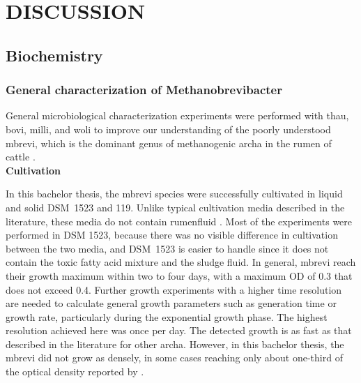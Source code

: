 \newpage
\section{DISCUSSION}



\subsection{Biochemistry}



\subsubsection{General characterization of \textup{Methanobrevibacter}}


General microbiological characterization experiments were performed with \acrshort{thau}, \acrshort{bovi}, \acrshort{milli}, and \acrshort{woli} to improve our understanding of the poorly understood \acrlong{mbrevi}, which is the dominant genus of methanogenic \gls{archa} in the rumen of cattle \parencite{baca-gonzalezAreVaccinesSolution2020}. \\

\textbf{Cultivation} 

\noindent In this bachelor thesis, the \acrlong{mbrevi} species were successfully cultivated in liquid and solid DSM~1523 and 119. Unlike typical cultivation media described in the literature, these media do not contain rumenfluid \parencite{liMethanobrevibacterBoviskoreaniJH1T2023, leeMethanobrevibacterBoviskoreaniSp2013, millerDescriptionMethanobrevibacterGottschalkii2002}. Most of the experiments were performed in DSM 1523, because there was no visible difference in cultivation between the two media, and DSM~1523 is easier to handle since it does not contain the toxic fatty acid mixture and the sludge fluid. In general, \acrlong{mbrevi} reach their growth maximum within two to four days, with a maximum \acrshort{OD} of 0.3 that does not exceed 0.4. Further growth experiments with a higher time resolution are needed to calculate general growth parameters such as generation time or growth rate, particularly during the exponential growth phase. The highest resolution achieved here was once per day. The detected growth is as fast as that described in the literature for other \gls{archa}. However, in this bachelor thesis, the \acrlong{mbrevi} did not grow as densely, in some cases reaching only about one-third of the optical density reported by \textcite{liMethanobrevibacterBoviskoreaniJH1T2023, hoedtDifferencesDownunderAlcoholfueled2016}.


